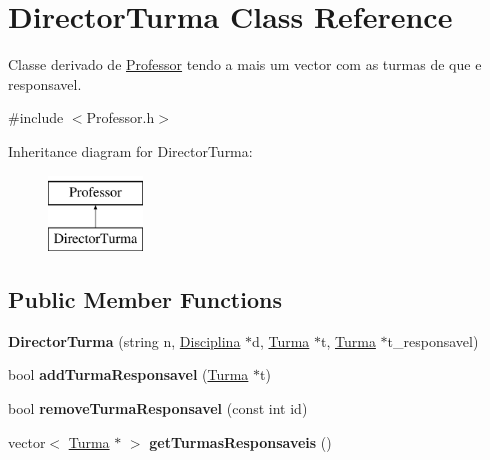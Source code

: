 \hypertarget{class_director_turma}{\section{Director\-Turma Class Reference}
\label{class_director_turma}
}


Classe derivado de \hyperlink{class_professor}{Professor} tendo a mais um vector com as turmas de que e responsavel.  




{\ttfamily \#include $<$Professor.\-h$>$}

Inheritance diagram for Director\-Turma\-:\begin{figure}[H]
\begin{center}
\leavevmode
\includegraphics[height=2.000000cm]{class_director_turma}
\end{center}
\end{figure}
\subsection*{Public Member Functions}
\begin{DoxyCompactItemize}
\item 
\hypertarget{class_director_turma_a68cae9fe812395183f4da5e8b2f5cfe6}{{\bfseries Director\-Turma} (string n, \hyperlink{class_disciplina}{Disciplina} $\ast$d, \hyperlink{class_turma}{Turma} $\ast$t, \hyperlink{class_turma}{Turma} $\ast$t\-\_\-responsavel)}\label{class_director_turma_a68cae9fe812395183f4da5e8b2f5cfe6}

\item 
\hypertarget{class_director_turma_a99567238fee363836711fb01e7b49617}{bool {\bfseries add\-Turma\-Responsavel} (\hyperlink{class_turma}{Turma} $\ast$t)}\label{class_director_turma_a99567238fee363836711fb01e7b49617}

\item 
\hypertarget{class_director_turma_a08f76bfffd82b428bd601773fe44a26e}{bool {\bfseries remove\-Turma\-Responsavel} (const int id)}\label{class_director_turma_a08f76bfffd82b428bd601773fe44a26e}

\item 
\hypertarget{class_director_turma_ad481d568f5e9f30ddcfa6a6c65daaf1b}{vector$<$ \hyperlink{class_turma}{Turma} $\ast$ $>$ {\bfseries get\-Turmas\-Responsaveis} ()}\label{class_director_turma_ad481d568f5e9f30ddcfa6a6c65daaf1b}

\end{DoxyCompactItemize}


